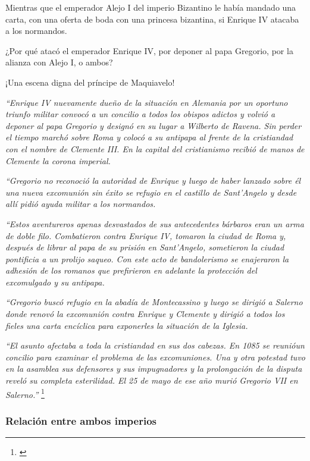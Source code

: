 Mientras que el emperador Alejo I del imperio Bizantino le había mandado
una carta, con una oferta de boda con una princesa bizantina,
si Enrique IV atacaba a los normandos.

¿Por qué atacó el emperador Enrique IV, por deponer al papa Gregorio,
por la alianza con Alejo I, o ambos?

¡Una escena digna del príncipe de Maquiavelo!

\textit{
	``Enrique IV nuevamente dueño de la situación en Alemania por
	un oportuno triunfo militar convocó a un concilio a todos
	los obispos adictos y volvió a deponer al papa Gregorio
	y designó en su lugar a Wilberto de Ravena. Sin perder
	el tiempo marchó sobre Roma y colocó a su antipapa al frente
	de la cristiandad con el nombre de Clemente III.
	En la capital del cristianismo recibió de manos de Clemente
	la corona imperial.
}

\textit{
	``Gregorio no reconoció la autoridad de Enrique y luego
	de haber lanzado sobre él una nueva excomunión sin éxito
	se refugio en el castillo de Sant'Angelo y desde allí
	pidió ayuda militar a los normandos.
}

\textit{
	``Estos aventureros apenas desvastados de sus antecedentes
	bárbaros eran un arma de doble filo. Combatieron contra
	Enrique IV, tomaron la ciudad de Roma y, después de librar
	al papa de su prisión en Sant'Angelo, sometieron la ciudad
	pontificia a un prolijo saqueo. Con este acto de bandolerismo
	se enajeraron la adhesión de los romanos que prefirieron
	en adelante la protección del excomulgado y su antipapa.
}

\textit{
	``Gregorio buscó refugio en la abadía de Montecassino y luego
	se dirigió a Salerno donde renovó la excomunión contra
	Enrique y Clemente y dirigió a todos los fieles una carta
	encíclica para exponerles la situación de la Iglesia.
}

\textit{
	``El asunto afectaba a toda la cristiandad en sus dos cabezas.
	En 1085 se reunióun concilio para examinar el problema
	de las excomuniones. Una y otra potestad tuvo en la
	asamblea sus defensores y sus impugnadores y la prolongación
	de la disputa reveló su completa esterilidad. El 25 de mayo de
	ese año murió Gregorio VII en Salerno.''
}\footnote{\cite[p.~871--872]{ciudad}}

\subsubsection{Relación entre ambos imperios}

